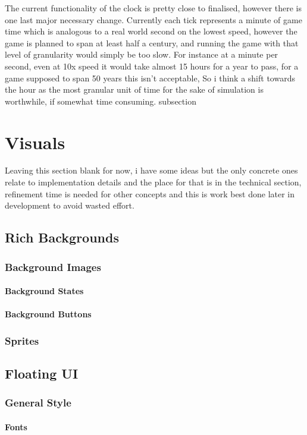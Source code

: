 \documentclass[12pt, a4paper]{scrreprt}
\begin{document}
	The current functionality of the clock is pretty close to finalised, however there is one last major necessary change. Currently each tick represents a minute of game time which is analogous to a real world second on the lowest speed, however the game is planned to span at least half a century, and running the game with that level of granularity would simply be too slow. For instance at a minute per second, even at 10x speed it would take almost 15 hours for a year to pass, for a game supposed to span 50 years this isn't acceptable, So i think a shift towards the hour as the most granular unit of time for the sake of simulation is worthwhile, if somewhat time consuming.
	subsection{}
	\part{Visuals}
	Leaving this section blank for now, i have some ideas but the only concrete ones relate to implementation details and the place for that is in the technical section, refinement time is needed for other concepts and this is work best done later in development to avoid wasted effort.
	\chapter{Rich Backgrounds}
	\section{Background Images}
	\subsection{Background States}
	\subsection{Background Buttons}
	\section{Sprites}
	\chapter{Floating UI}
	\section{General Style}
	\subsection{Fonts}
\end{document}
